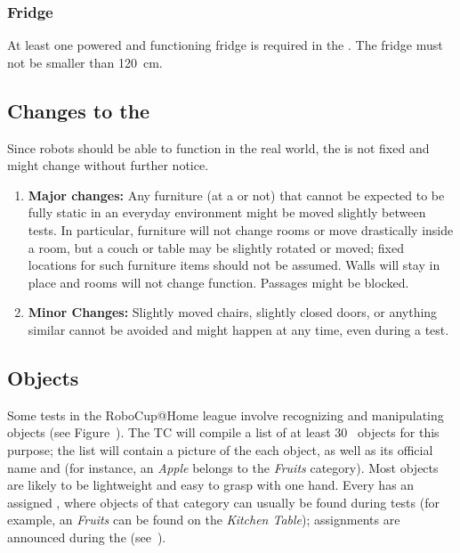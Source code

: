 \subsubsection{Fridge}

At least one powered and functioning fridge is required in the \Arena.
The fridge must not be smaller than \SI{120}{\centi\meter}.

\subsection{Changes to the \Arena}\label{rule:scenario_changes}

Since robots should be able to function in the real world, the \Arena{} is not fixed and might change without further notice.
\begin{enumerate}
	\item \textbf{Major changes:}
	Any furniture (at a \PredefinedLocation{} or not) that cannot be expected to be fully static in an everyday environment might be moved slightly between tests.
	In particular, furniture will not change rooms or move drastically inside a room, but a couch or table may be slightly rotated or moved; fixed locations for such furniture items should not be assumed.
	Walls will stay in place and rooms will not change function.
	Passages might be blocked.
	\item \textbf{Minor Changes:} Slightly moved chairs, slightly closed doors, or anything similar cannot be avoided and might happen at any time, even during a test.
\end{enumerate}


%
%
%
\def\NumObjects{30\ }
\def\NumLocations{20\ }
\def\NumNames{20\ }

\subsection{Objects}\label{rule:scenario_objects}

Some tests in the RoboCup@Home league involve recognizing and manipulating objects (see Figure~).
The TC will compile a list of at least \NumObjects{} objects for this purpose; the list will contain a picture of the each object, as well as its official name and \ObjectCategory{} (for instance, an \textit{Apple} belongs to the \textit{Fruits} category).
Most objects are likely to be lightweight and easy to grasp with one hand.
Every \ObjectCategory{} has an assigned \PredefinedLocation, where objects of that category can usually be found during tests (for example, an \textit{Fruits} can be found on the \textit{Kitchen Table}); assignments are announced during the \SetupDays{} (see~).


